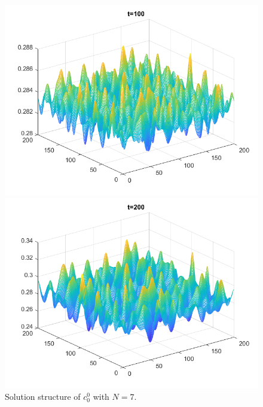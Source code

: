 \begin{frame}
\begin{figure}[H]
	\begin{minipage}{0.4\textwidth}
		\centering
		\includegraphics[scale=0.25]{Bilder_wxwy/14th_t=100_mx=my=200_random_Dr=1_(1.d0+(1.d-2rand(0)-5.d-4))Divide(2.d0dsqrt(pi))}
		\end{minipage}
		\hfill 
		\begin{minipage}{0.4\textwidth}
			\centering
			\includegraphics[scale=0.25]{Bilder_wxwy/14th_t=200_mx=my=200_random_Dr=1_(1.d0+(1.d-2rand(0)-5.d-4))Divide(2.d0dsqrt(pi))}
		\end{minipage}
		\caption{Solution structure of \(c^0_0\) with \(N = 7\).}
	\end{figure}
\end{frame}



